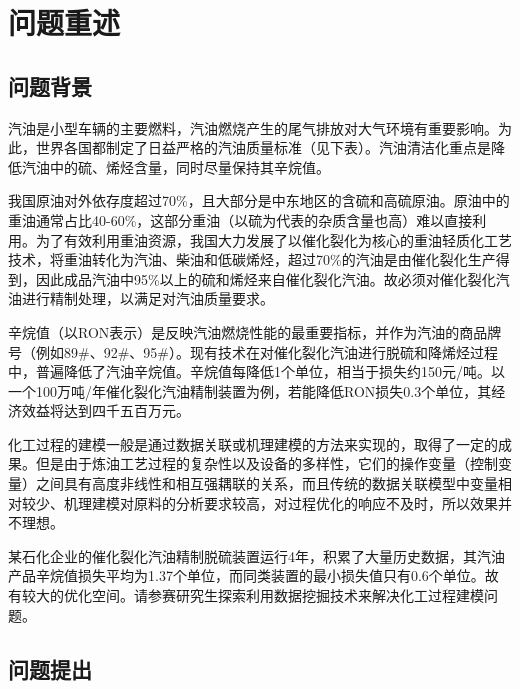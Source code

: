 \documentclass[bwprint]{gmcmthesis}
\begin{document}


\pagestyle{plain}


 \tableofcontents

\newpage


\FloatBarrier
\section{问题重述}
\FloatBarrier
\subsection{问题背景}

汽油是小型车辆的主要燃料，汽油燃烧产生的尾气排放对大气环境有重要影响。为此，世界各国都制定了日益严格的汽油质量标准（见下表）。汽油清洁化重点是降低汽油中的硫、烯烃含量，同时尽量保持其辛烷值。

我国原油对外依存度超过70\%，且大部分是中东地区的含硫和高硫原油。原油中的重油通常占比40-60\%，这部分重油（以硫为代表的杂质含量也高）难以直接利用。为了有效利用重油资源，我国大力发展了以催化裂化为核心的重油轻质化工艺技术，将重油转化为汽油、柴油和低碳烯烃，超过70\%的汽油是由催化裂化生产得到，因此成品汽油中95\%以上的硫和烯烃来自催化裂化汽油。故必须对催化裂化汽油进行精制处理，以满足对汽油质量要求。

辛烷值（以RON表示）是反映汽油燃烧性能的最重要指标，并作为汽油的商品牌号（例如89\#、92\#、95\#）。现有技术在对催化裂化汽油进行脱硫和降烯烃过程中，普遍降低了汽油辛烷值。辛烷值每降低1个单位，相当于损失约150元/吨。以一个100万吨/年催化裂化汽油精制装置为例，若能降低RON损失0.3个单位，其经济效益将达到四千五百万元。

化工过程的建模一般是通过数据关联或机理建模的方法来实现的，取得了一定的成果。但是由于炼油工艺过程的复杂性以及设备的多样性，它们的操作变量（控制变量）之间具有高度非线性和相互强耦联的关系，而且传统的数据关联模型中变量相对较少、机理建模对原料的分析要求较高，对过程优化的响应不及时，所以效果并不理想。

某石化企业的催化裂化汽油精制脱硫装置运行4年，积累了大量历史数据，其汽油产品辛烷值损失平均为1.37个单位，而同类装置的最小损失值只有0.6个单位。故有较大的优化空间。请参赛研究生探索利用数据挖掘技术来解决化工过程建模问题。




\FloatBarrier
\subsection{问题提出}
\end{document}
